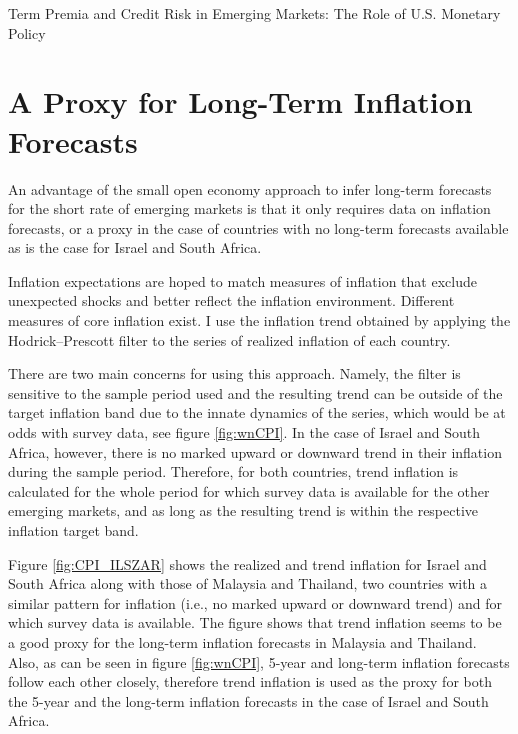 \documentclass[a4paper, 12pt]{article}
\begin{document}
\newpage
\begin{appendices}
	{\centering Term Premia and Credit Risk in Emerging Markets: The Role of U.S. Monetary Policy}
	\renewcommand\thefigure{\thesection.\arabic{figure}}
	\section{A Proxy for Long-Term Inflation Forecasts} \label{sec:trendinf}
	\setcounter{page}{1}
	\setcounter{figure}{0}
	
	An advantage of the small open economy approach to infer long-term forecasts for the short rate of emerging markets is that it only requires data on inflation forecasts, or a proxy in the case of countries with no long-term forecasts available as is the case for Israel and South Africa.
	
	Inflation expectations are hoped to match measures of inflation that exclude unexpected shocks and better reflect the inflation environment. 
	Different measures of core inflation exist. I use the inflation trend obtained by applying the Hodrick--Prescott filter to the series of realized inflation of each country.
	
	There are two main concerns for using this approach. Namely, the filter is sensitive to the sample period used and the resulting trend can be outside of the target inflation band due to the innate dynamics of the series, which would be at odds with survey data, see figure \ref{fig:wnCPI}. In the case of Israel and South Africa, however, there is no marked upward or downward trend in their inflation during the sample period. Therefore, for both countries, trend inflation is calculated for the whole period for which survey data is available for the other emerging markets, and as long as the resulting trend is within the respective inflation target band.
	
	Figure \ref{fig:CPI_ILSZAR} shows the realized and trend inflation for Israel and South Africa along with those of Malaysia and Thailand, two countries with a similar pattern for inflation (i.e., no marked upward or downward trend) and for which survey data is available. 
	The figure shows that trend inflation seems to be a good proxy for the long-term inflation forecasts in Malaysia and Thailand. 
	Also, as can be seen in figure \ref{fig:wnCPI}, 5-year and long-term inflation forecasts follow each other closely, therefore trend inflation is used as the proxy for both the 5-year and the long-term inflation forecasts in the case of Israel and South Africa.
	

\end{appendices}
\end{document}
